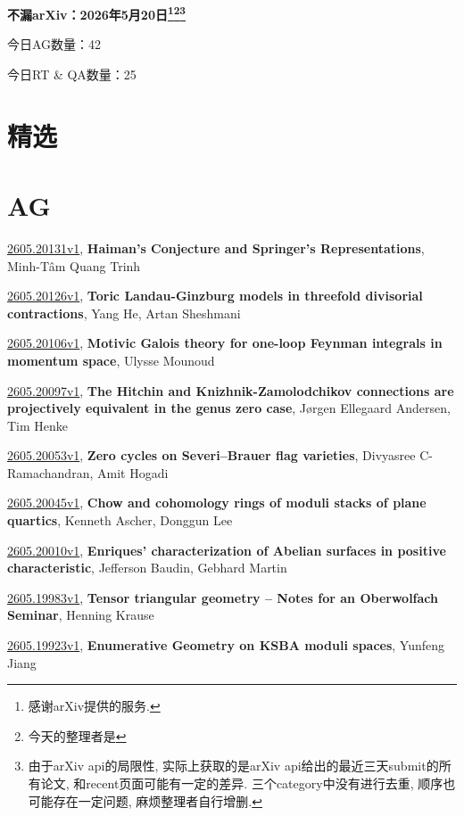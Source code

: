 \documentclass[9pt, a4paper]{article}
\theoremstyle{plain}
\theoremstyle{definition}
\theoremstyle{remark}
\newcommand{\arxiv}[3]{\href{https://arxiv.org/abs/#1}{#1}, \textbf{\textcolor{arxivblue}{#2}}, #3}
\newcommand{\AGnumber}{42}
\newcommand{\RTQAnumber}{25}
\newcommand{\NewestDate}{2026年5月20日}
\newcommand{\todayarXiver}{} %
\begin{document}
\begin{center}
    \Huge\textbf{不漏arXiv：\NewestDate\footnote{感谢arXiv提供的服务.}\footnote{今天的整理者是\todayarXiver}\footnote{由于arXiv api的局限性, 实际上获取的是arXiv api给出的最近三天submit的所有论文, 和recent页面可能有一定的差异. 三个category中没有进行去重, 顺序也可能存在一定问题, 麻烦整理者自行增删.}} \\
\end{center}

\setcounter{section}{-1}

\begin{center}
    今日AG数量：\AGnumber
    
    今日RT \& QA数量：\RTQAnumber
    
\end{center}


\section{精选}


\section{AG}
\arxiv{2605.20131v1}{Haiman's Conjecture and Springer's Representations}{Minh-Tâm Quang Trinh}

\arxiv{2605.20126v1}{Toric Landau-Ginzburg models in threefold divisorial contractions}{Yang He, Artan Sheshmani}

\arxiv{2605.20106v1}{Motivic Galois theory for one-loop Feynman integrals in momentum space}{Ulysse Mounoud}

\arxiv{2605.20097v1}{The Hitchin and Knizhnik-Zamolodchikov connections are projectively equivalent in the genus zero case}{Jørgen Ellegaard Andersen, Tim Henke}

\arxiv{2605.20053v1}{Zero cycles on Severi--Brauer flag varieties}{Divyasree C-Ramachandran, Amit Hogadi}

\arxiv{2605.20045v1}{Chow and cohomology rings of moduli stacks of plane quartics}{Kenneth Ascher, Donggun Lee}

\arxiv{2605.20010v1}{Enriques' characterization of Abelian surfaces in positive characteristic}{Jefferson Baudin, Gebhard Martin}

\arxiv{2605.19983v1}{Tensor triangular geometry -- Notes for an Oberwolfach Seminar}{Henning Krause}

\arxiv{2605.19923v1}{Enumerative Geometry on KSBA moduli spaces}{Yunfeng Jiang}
\end{document}
